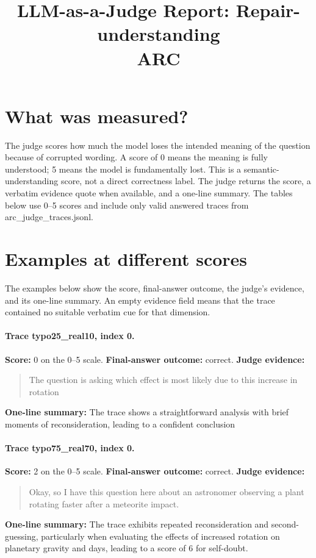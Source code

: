 \documentclass[11pt]{article}
\title{LLM-as-a-Judge Report: Repair-understanding\\\large ARC}
\date{}
\begin{document}
\maketitle

\section*{What was measured?} The judge scores how much the model loses the intended meaning of the question because of corrupted wording. A score of 0 means the meaning is fully understood; 5 means the model is fundamentally lost. This is a semantic-understanding score, not a direct correctness label. The judge returns the score, a verbatim evidence quote when available, and a one-line summary. The tables below use 0--5 scores and include only valid answered traces from arc\_judge\_traces.jsonl.

\section*{Examples at different scores} The examples below show the score, final-answer outcome, the judge's evidence, and its one-line summary. An empty evidence field means that the trace contained no suitable verbatim cue for that dimension.

\paragraph{Trace typo25\_real10, index 0.}
\textbf{Score:} 0 on the 0--5 scale. \textbf{Final-answer outcome:} correct.
\textbf{Judge evidence:} \begin{quote}The question is asking which effect is most likely due to this increase in rotation\end{quote}
\textbf{One-line summary:} The trace shows a straightforward analysis with brief moments of reconsideration, leading to a confident conclusion\medskip
\paragraph{Trace typo75\_real70, index 0.}
\textbf{Score:} 2 on the 0--5 scale. \textbf{Final-answer outcome:} correct.
\textbf{Judge evidence:} \begin{quote}Okay, so I have this question here about an astronomer observing a plant rotating faster after a meteorite impact.\end{quote}
\textbf{One-line summary:} The trace exhibits repeated reconsideration and second-guessing, particularly when evaluating the effects of increased rotation on planetary gravity and days, leading to a score of 6 for self-doubt.\medskip
\end{document}
